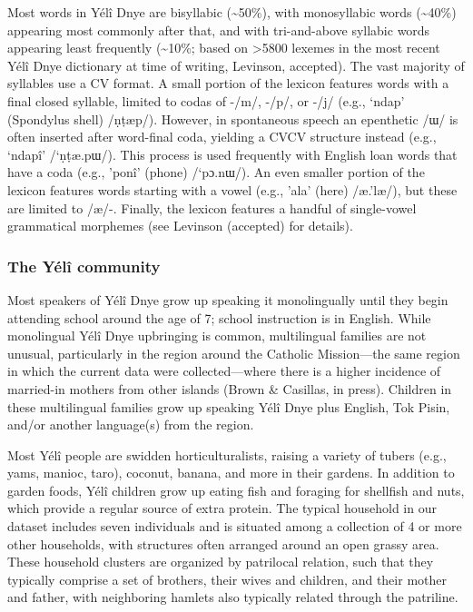 \documentclass[english,,man,floatsintext]{apa6}
\begin{document}
Most words in Yélî Dnye are bisyllabic (\textasciitilde{}50\%), with
monosyllabic words (\textasciitilde{}40\%) appearing most commonly after
that, and with tri-and-above syllabic words appearing least frequently
(\textasciitilde{}10\%; based on \textgreater{}5800 lexemes in the most
recent Yélî Dnye dictionary at time of writing, Levinson, accepted). The
vast majority of syllables use a CV format. A small portion of the
lexicon features words with a final closed syllable, limited to codas of
-/m/, -/p/, or -/j/ (e.g., `ndap' (Spondylus shell) /ṇṭæp/). However, in
spontaneous speech an epenthetic /ɯ/ is often inserted after word-final
coda, yielding a CVCV structure instead (e.g., `ndapî' /`ṇṭæ.pɯ/). This
process is used frequently with English loan words that have a coda
(e.g., 'ponî' (phone) /`pɔ.nɯ/). An even smaller portion of the lexicon
features words starting with a vowel (e.g., 'ala' (here) /æ.'læ/), but
these are limited to /æ/-. Finally, the lexicon features a handful of
single-vowel grammatical morphemes (see Levinson (accepted) for
details).

\subsubsection{The Yélî community}\label{the-yuxe9luxee-community}

Most speakers of Yélî Dnye grow up speaking it monolingually until they
begin attending school around the age of 7; school instruction is in
English. While monolingual Yélî Dnye upbringing is common, multilingual
families are not unusual, particularly in the region around the Catholic
Mission---the same region in which the current data were
collected---where there is a higher incidence of married-in mothers from
other islands (Brown \& Casillas, in press). Children in these
multilingual families grow up speaking Yélî Dnye plus English, Tok
Pisin, and/or another language(s) from the region.

Most Yélî people are swidden horticulturalists, raising a variety of
tubers (e.g., yams, manioc, taro), coconut, banana, and more in their
gardens. In addition to garden foods, Yélî children grow up eating fish
and foraging for shellfish and nuts, which provide a regular source of
extra protein. The typical household in our dataset includes seven
individuals and is situated among a collection of 4 or more other
households, with structures often arranged around an open grassy area.
These household clusters are organized by patrilocal relation, such that
they typically comprise a set of brothers, their wives and children, and
their mother and father, with neighboring hamlets also typically related
through the patriline.
\end{document}
